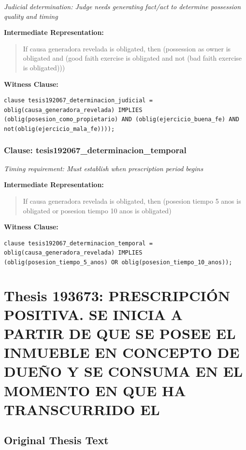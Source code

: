 \documentclass[11pt,a4paper]{article}
\begin{document}
\textit{Judicial determination: Judge needs generating fact/act to determine possession quality and timing}

\textbf{Intermediate Representation:}

\begin{quote}
If causa generadora revelada is obligated, then (possession as owner is obligated and (good faith exercise is obligated and not (bad faith exercise is obligated)))
\end{quote}

\textbf{Witness Clause:}

\begin{lstlisting}[style=witnessstyle, language=Witness]
clause tesis192067_determinacion_judicial = oblig(causa_generadora_revelada) IMPLIES (oblig(posesion_como_propietario) AND (oblig(ejercicio_buena_fe) AND not(oblig(ejercicio_mala_fe))));
\end{lstlisting}

\subsubsection{Clause: tesis192067\_determinacion\_temporal}

\textit{Timing requirement: Must establish when prescription period begins}

\textbf{Intermediate Representation:}

\begin{quote}
If causa generadora revelada is obligated, then (posesion tiempo 5 anos is obligated or posesion tiempo 10 anos is obligated)
\end{quote}

\textbf{Witness Clause:}

\begin{lstlisting}[style=witnessstyle, language=Witness]
clause tesis192067_determinacion_temporal = oblig(causa_generadora_revelada) IMPLIES (oblig(posesion_tiempo_5_anos) OR oblig(posesion_tiempo_10_anos));
\end{lstlisting}

\newpage

\section{Thesis 193673: PRESCRIPCIÓN POSITIVA. SE INICIA A PARTIR DE QUE SE POSEE EL INMUEBLE EN CONCEPTO DE DUEÑO Y SE CONSUMA EN EL MOMENTO EN QUE HA TRANSCURRIDO EL}
\label{thesis:193673}

\subsection{Original Thesis Text}
\end{document}

